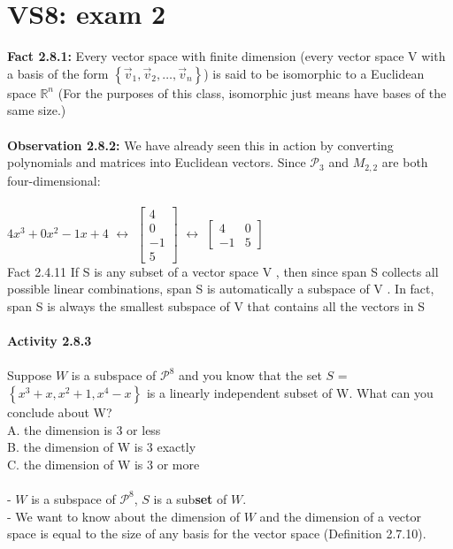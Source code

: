\documentclass{article}
\begin{document}
{\section{VS8: exam 2}

\noindent \textbf{Fact 2.8.1:} Every vector space with finite dimension (every vector space V with a basis of the form $\left\{ \vec{v}_{1}, \vec{v}_{2}, \ldots, \vec{v}_{n} \right\}$) is said to be isomorphic to a Euclidean space $\mathbb{R}^{n}$ (For the purposes of this class, isomorphic just means have bases of the same size.)\\
\\
\noindent \textbf{Observation 2.8.2:} We have already seen this in action by converting polynomials and matrices into Euclidean vectors. Since $\mathcal{P}_{3}$ and $M_{2,2}$ are both four-dimensional:\\
\\
$4x^{3} + 0x^{2} - 1x + 4$ 
$\leftrightarrow$ 
$\left[\begin{matrix} 4\\0\\-1\\5 \end{matrix}\right]$ 
$\leftrightarrow$ 
$\left[\begin{matrix} 4&0\\-1&5 \end{matrix}\right]$
\\
Fact 2.4.11 If S is any subset of a vector space V , then since span S collects
all possible linear combinations, span S is automatically a subspace of V .
In fact, span S is always the smallest subspace of V that contains all the
vectors in S\\
\\
\noindent \textbf{Activity 2.8.3} \\
\\
Suppose $W$ is a subspace of $\mathcal{P}^{8}$ and you know that the set $S$ = $\left\{ x^{3} + x, x^{2} + 1, x^{4} -x  \right\}$ is a linearly independent subset of W. What can you conclude about W?\\
A. the dimension is 3 or less\\
B. the dimension of W is 3 exactly\\
C. the dimension of W is 3 or more\\
\\
- $W$ is a subspace of $\mathcal{P}^{8}$, $S$ is a sub\textbf{set} of $W$.\\
- We want to know about the dimension of $W$ and the dimension of a vector space is equal to the size of any basis for the vector space (Definition 2.7.10).\\
}
\end{document}

